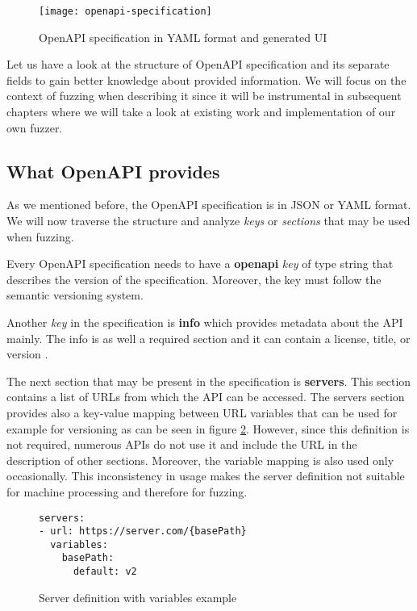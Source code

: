 \begin{figure}[h]
  \texttt{[image: openapi-specification]}
  \caption{OpenAPI specification in YAML format and generated UI}
  \label{fig:openapi-specification}
\end{figure}

Let us have a look at the structure of OpenAPI specification and its separate fields to gain better knowledge about provided information. We will focus on the context of fuzzing when describing it since it will be instrumental in subsequent chapters where we will take a look at existing work and implementation of our own fuzzer.

\subsection{What OpenAPI provides}
As we mentioned before, the OpenAPI specification is in JSON or YAML format. We will now traverse the structure and analyze \textit{keys} or \textit{sections} that may be used when fuzzing.

Every OpenAPI specification needs to have a \textbf{openapi} \textit{key} of type string that describes the version of the specification. Moreover, the key must follow the semantic versioning system.

Another \textit{key} in the specification is \textbf{info} which provides metadata about the API mainly. The info is as well a required section and it can contain a license, title, or version \cite{openapi2020github}.

The next section that may be present in the specification is \textbf{servers}. This section contains a list of URLs from which the API can be accessed. The servers section provides also a key-value mapping between URL variables that can be used for example for versioning as can be seen in figure \ref{fig:Server definition with variables}. However, since this definition is not required, numerous APIs do not use it and include the URL in the description of other sections. Moreover, the variable mapping is also used only occasionally. This inconsistency in usage makes the server definition not suitable for machine processing and therefore for fuzzing.

\begin{figure}[h]
  \begin{verbatim}
servers:
- url: https://server.com/{basePath}
  variables:
    basePath:
      default: v2
  \end{verbatim}
  \caption{Server definition with variables example}
  \label{fig:Server definition with variables}
\end{figure}

